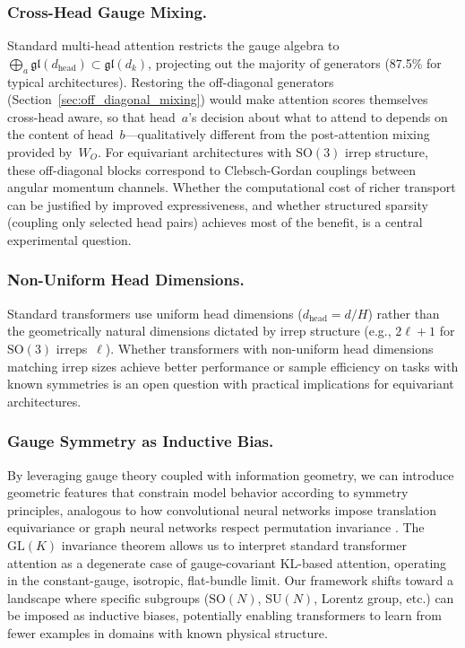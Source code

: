 \documentclass[twoside,11pt]{article}
\begin{document}
\subsubsection{Cross-Head Gauge Mixing.}

Standard multi-head attention restricts the gauge algebra to $\bigoplus_a \mathfrak{gl}(d_{\mathrm{head}}) \subset \mathfrak{gl}(d_k)$, projecting out the majority of generators (87.5\% for typical architectures). Restoring the off-diagonal generators (Section~\ref{sec:off_diagonal_mixing}) would make attention scores themselves cross-head aware, so that head~$a$'s decision about what to attend to depends on the content of head~$b$---qualitatively different from the post-attention mixing provided by~$W_O$. For equivariant architectures with $\mathrm{SO}(3)$ irrep structure, these off-diagonal blocks correspond to Clebsch-Gordan couplings between angular momentum channels. Whether the computational cost of richer transport can be justified by improved expressiveness, and whether structured sparsity (coupling only selected head pairs) achieves most of the benefit, is a central experimental question.

\subsubsection{Non-Uniform Head Dimensions.}

Standard transformers use uniform head dimensions ($d_{\mathrm{head}} = d/H$) rather than the geometrically natural dimensions dictated by irrep structure (e.g., $2\ell + 1$ for $\mathrm{SO}(3)$ irreps~$\ell$). Whether transformers with non-uniform head dimensions matching irrep sizes achieve better performance or sample efficiency on tasks with known symmetries is an open question with practical implications for equivariant architectures.

\subsubsection{Gauge Symmetry as Inductive Bias.}

By leveraging gauge theory coupled with information geometry, we can introduce geometric features that constrain model behavior according to symmetry principles, analogous to how convolutional neural networks impose translation equivariance or graph neural networks respect permutation invariance \citep{finzi2020generalizing,weiler20183d,kondor2018generalization}. The $\mathrm{GL}(K)$ invariance theorem allows us to interpret standard transformer attention as a degenerate case of gauge-covariant KL-based attention, operating in the constant-gauge, isotropic, flat-bundle limit. Our framework shifts toward a landscape where specific subgroups ($\mathrm{SO}(N)$, $\mathrm{SU}(N)$, Lorentz group, etc.) can be imposed as inductive biases, potentially enabling transformers to learn from fewer examples in domains with known physical structure.
\end{document}
